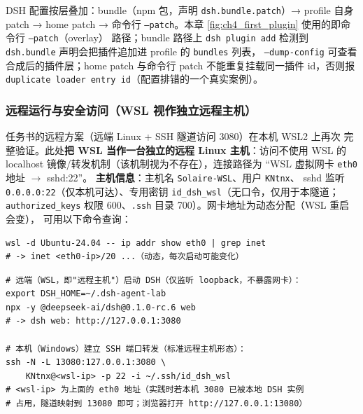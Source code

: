 DSH 配置按层叠加：bundle（npm 包，声明 \texttt{dsh.bundle.patch}）→
profile 自身 patch → home patch → 命令行 \texttt{--patch}。本章
\ref{fig:ch4_first_plugin} 使用的即命令行 \texttt{--patch}（overlay）
路径；bundle 路径上 \texttt{dsh plugin add} 检测到 \texttt{dsh.bundle}
声明会把插件追加进 profile 的 \texttt{bundles} 列表，
\texttt{--dump-config} 可查看合成后的插件层；home patch 与命令行
patch 不能重复挂载同一插件 id，否则报 \texttt{duplicate loader entry
id}（配置排错的一个真实案例）。

\subsubsection{远程运行与安全访问（WSL 视作独立远程主机）}

任务书的远程方案（远端 Linux + SSH 隧道访问 3080）在本机 WSL2 上再次
完整验证。此处\textbf{把 WSL 当作一台独立的远程 Linux 主机}：访问不使用
WSL 的 localhost 镜像/转发机制（该机制视为不存在），连接路径为
``WSL 虚拟网卡 \texttt{eth0} 地址 $\rightarrow$ sshd:22''。
\textbf{主机信息}：主机名 \texttt{Solaire-WSL}、用户 \texttt{KNtnx}、
sshd 监听 \texttt{0.0.0.0:22}（仅本机可达）、专用密钥
\texttt{id\_dsh\_wsl}（无口令，仅用于本隧道；\texttt{authorized\_keys}
权限 600、\texttt{.ssh} 目录 700）。网卡地址为动态分配（WSL 重启会变），
可用以下命令查询：

\begin{verbatim}
wsl -d Ubuntu-24.04 -- ip addr show eth0 | grep inet
# -> inet <eth0-ip>/20 ...（动态，每次启动可能变化）
\end{verbatim}

\begin{verbatim}
# 远端（WSL，即"远程主机"）启动 DSH（仅监听 loopback，不暴露网卡）：
export DSH_HOME=~/.dsh-agent-lab
npx -y @deepseek-ai/dsh@0.1.0-rc.6 web
# -> dsh web: http://127.0.0.1:3080

# 本机（Windows）建立 SSH 端口转发（标准远程主机形态）：
ssh -N -L 13080:127.0.0.1:3080 \
    KNtnx@<wsl-ip> -p 22 -i ~/.ssh/id_dsh_wsl
# <wsl-ip> 为上面的 eth0 地址（实践时若本机 3080 已被本地 DSH 实例
# 占用，隧道映射到 13080 即可；浏览器打开 http://127.0.0.1:13080）
\end{verbatim}

